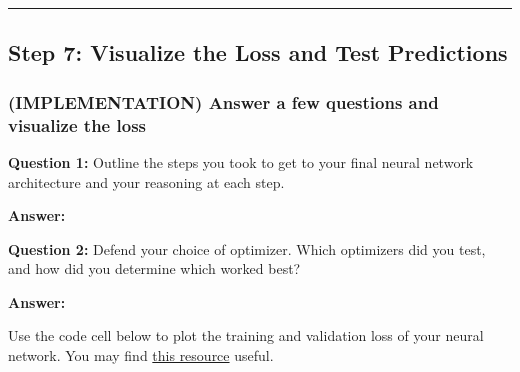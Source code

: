 \documentclass[11pt]{article}
\begin{document}
    \begin{center}\rule{0.5\linewidth}{\linethickness}\end{center}

\subsection{Step 7: Visualize the Loss and Test
Predictions}\label{step-7-visualize-the-loss-and-test-predictions}

    \subsubsection{(IMPLEMENTATION) Answer a few questions and visualize the
loss}\label{implementation-answer-a-few-questions-and-visualize-the-loss}

\textbf{Question 1:} Outline the steps you took to get to your final
neural network architecture and your reasoning at each step.

\textbf{Answer:}

\textbf{Question 2:} Defend your choice of optimizer. Which optimizers
did you test, and how did you determine which worked best?

\textbf{Answer:}

Use the code cell below to plot the training and validation loss of your
neural network. You may find
\href{http://machinelearningmastery.com/display-deep-learning-model-training-history-in-keras/}{this
resource} useful.
\end{document}
